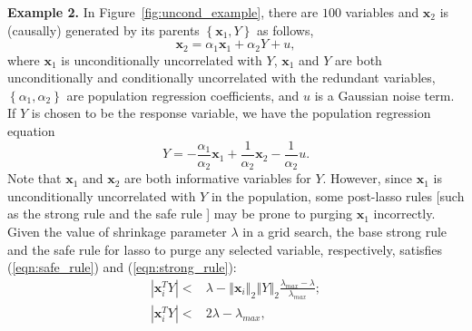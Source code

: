 \documentclass[11pt,review,authoryear]{elsarticle}
\begin{document}
\smallskip
\noindent
\textbf{Example 2.} In Figure~\ref{fig:uncond_example}, there are $100$ variables and $\mathbf{x}_2$ is (causally) generated by its parents $\left\{ \mathbf{x}_1, Y \right\}$ as follows,
%
\begin{equation}
  \mathbf{x}_2 = \alpha_1 \mathbf{x}_1 + \alpha_2 Y + u,
  \label{eqn:collider_1}
\end{equation}
%
where $\mathbf{x}_1$ is unconditionally uncorrelated with $Y$, $\mathbf{x}_1$ and $Y$ are both unconditionally and conditionally uncorrelated with the redundant variables, $\left\{\alpha_1, \alpha_2 \right\}$ are population regression coefficients, and $u$ is a Gaussian noise term. If $Y$ is chosen to be the response variable, we have the population regression equation
%
\begin{equation}
  Y = -\frac{\alpha_1}{\alpha_2} \mathbf{x}_1 + \frac{1}{\alpha_2} \mathbf{x}_2 - \frac{1}{\alpha_2}u.
  \label{eqn:collider_2}
\end{equation}
%
Note that $\mathbf{x}_1$ and $\mathbf{x}_2$ are both informative variables for $Y$. However, since $\mathbf{x}_1$ is unconditionally uncorrelated with $Y$ in the population, some post-lasso rules [such as the strong rule \citep{tibshirani2012strong} and the safe rule \citep{ghaoui2010safe}] may be prone to purging $\mathbf{x}_1$ incorrectly. Given the value of shrinkage parameter $\lambda$ in a grid search, the base strong rule and the safe rule for lasso to purge any selected variable, respectively, satisfies (\ref{eqn:safe_rule}) and (\ref{eqn:strong_rule}):
%
\begin{eqnarray}
  \left\vert \mathbf{x}_i^T Y \right\vert < & \lambda - \left\Vert \mathbf{x}_i \right\Vert_2 \left\Vert Y \right\Vert_2 \frac{\lambda_{max} - \lambda} {\lambda_{max}} ; \label{eqn:safe_rule} \\
  \left\vert \mathbf{x}_i^T Y \right\vert < & 2\lambda - \lambda_{max} , \label{eqn:strong_rule}
  \label{eqn:post_estmation_rule}
\end{eqnarray}
%
\end{document}
